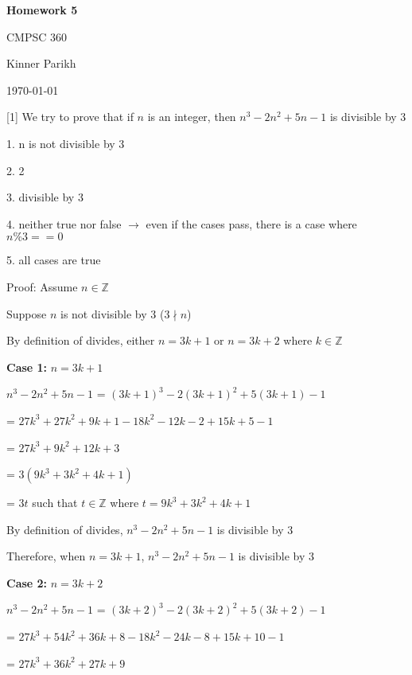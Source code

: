 \documentclass{article} %
\newcommand{\question}[2][]{\begin{flushleft}
        \textbf{Question #1}: #2
\end{flushleft}}
\newcommand{\maketitletwo}[2][]{\begin{center}
        \Large{\textbf{Homework #1}
            
            CMPSC 360} %
        \vspace{5pt}
        
        \normalsize{Kinner Parikh  %
        
        \today}        %
        \vspace{15pt}
        
\end{center}}
\begin{document}
    \maketitletwo[5]  %

                                                               
    
    \question[1]{ We try to prove that if $n$ is an integer, then $n^3-2n^2+5n-1$ is divisible by 3}

    1. n is not divisible by 3

    2. 2

    3. divisible by 3

    4. neither true nor false $\rightarrow$ even if the cases pass, there is a case where $n \% 3 == 0$

    5. all cases are true


    Proof: Assume $n \in \mathbb{Z}$

    Suppose $n$ is not divisible by 3 ($3 \nmid n$)

    By definition of divides, either $n = 3k + 1$ or $n = 3k +2$ where $k \in \mathbb{Z}$

    \textbf{Case 1:} $n = 3k + 1$

    $n^3-2n^2+5n-1$ = $(3k + 1)^3 - 2(3k + 1)^2 + 5(3k + 1) - 1$

    \tabto*{3.4cm} = $27k^3 + 27k^2 + 9k + 1 - 18k^2 - 12k - 2 + 15k + 5 - 1$

    \tabto*{3.4cm} = $27k^3 + 9k^2 + 12k + 3$

    \tabto*{3.4cm} = $3(9k^3 + 3k^2 + 4k + 1)$

    \tabto*{3.4cm} = $3t$ such that $t \in \mathbb{Z}$ where $t = 9k^3 + 3k^2 + 4k + 1$

    By definition of divides, $n^3-2n^2+5n-1$ is divisible by 3

    Therefore, when $n = 3k + 1$, $n^3-2n^2+5n-1$ is divisible by 3

    \textbf{Case 2:} $n = 3k + 2$

    $n^3-2n^2+5n-1$ = $(3k + 2)^3 - 2(3k + 2)^2 + 5(3k + 2) - 1$
    
    \tabto*{3.4cm} = $27k^3 + 54k^2 + 36k + 8 - 18k^2 - 24k - 8 + 15k + 10 - 1$

    \tabto*{3.4cm} = $27k^3 + 36k^2 + 27k + 9$
\end{document}
